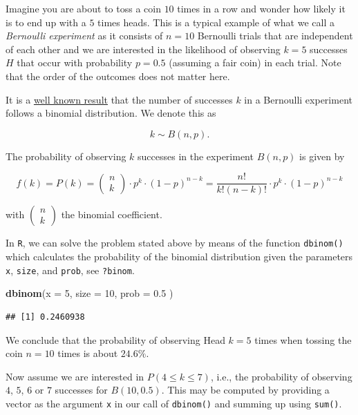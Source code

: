 \documentclass[]{book}
\newenvironment{Shaded}{\begin{snugshade}}{\end{snugshade}}
\newcommand{\KeywordTok}[1]{\textcolor[rgb]{0.13,0.29,0.53}{\textbf{#1}}}
\newcommand{\DataTypeTok}[1]{\textcolor[rgb]{0.13,0.29,0.53}{#1}}
\newcommand{\DecValTok}[1]{\textcolor[rgb]{0.00,0.00,0.81}{#1}}
\newcommand{\FloatTok}[1]{\textcolor[rgb]{0.00,0.00,0.81}{#1}}
\newcommand{\NormalTok}[1]{#1}
\theoremstyle{definition}
\theoremstyle{definition}
\theoremstyle{definition}
\theoremstyle{remark}
\begin{document}
Imagine you are about to toss a coin \(10\) times in a row and wonder
how likely it is to end up with a \(5\) times heads. This is a typical
example of what we call a \emph{Bernoulli experiment} as it consists of
\(n=10\) Bernoulli trials that are independent of each other and we are
interested in the likelihood of observing \(k=5\) successes \(H\) that
occur with probability \(p=0.5\) (assuming a fair coin) in each trial.
Note that the order of the outcomes does not matter here.

It is a \href{https://en.wikipedia.org/wiki/Binomial_distribution}{well
known result} that the number of successes \(k\) in a Bernoulli
experiment follows a binomial distribution. We denote this as

\[k \sim B(n,p).\]

The probability of observing \(k\) successes in the experiment
\(B(n,p)\) is given by

\[f(k)=P(k)=\begin{pmatrix}n\\ k \end{pmatrix} \cdot p^k \cdot
(1-p)^{n-k}=\frac{n!}{k!(n-k)!} \cdot p^k \cdot (1-p)^{n-k}\]

with \(\begin{pmatrix}n\\ k \end{pmatrix}\) the binomial coefficient.

In \texttt{R}, we can solve the problem stated above by means of the
function \texttt{dbinom()} which calculates the probability of the
binomial distribution given the parameters \texttt{x}, \texttt{size},
and \texttt{prob}, see \texttt{?binom}.

\begin{Shaded}
\begin{Highlighting}[]
\KeywordTok{dbinom}\NormalTok{(}\DataTypeTok{x =} \DecValTok{5}\NormalTok{,}
       \DataTypeTok{size =} \DecValTok{10}\NormalTok{,}
       \DataTypeTok{prob =} \FloatTok{0.5}
\NormalTok{       ) }
\end{Highlighting}
\end{Shaded}

\begin{verbatim}
## [1] 0.2460938
\end{verbatim}

We conclude that the probability of observing Head \(k=5\) times when
tossing the coin \(n=10\) times is about \(24.6\%\).

Now assume we are interested in \(P(4 \leq k \leq 7)\), i.e., the
probability of observing \(4\), \(5\), \(6\) or \(7\) successes for
\(B(10,0.5)\). This may be computed by providing a vector as the
argument \texttt{x} in our call of \texttt{dbinom()} and summing up
using \texttt{sum()}.
\end{document}
